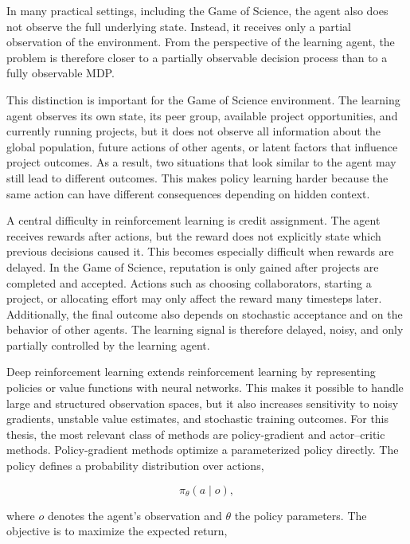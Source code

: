 \documentclass[english,bachelor]{hsluthesis}
\begin{document}
In many practical settings, including the Game of Science, the agent also does not observe the full underlying state. Instead, it receives only a partial observation of the environment. From the perspective of the learning agent, the problem is therefore closer to a partially observable decision process than to a fully observable MDP.

This distinction is important for the Game of Science environment. The learning agent observes its own state, its peer group, available project opportunities, and currently running projects, but it does not observe all information about the global population, future actions of other agents, or latent factors that influence project outcomes. As a result, two situations that look similar to the agent may still lead to different outcomes. This makes policy learning harder because the same action can have different consequences depending on hidden context.

A central difficulty in reinforcement learning is credit assignment. The agent receives rewards after actions, but the reward does not explicitly state which previous decisions caused it. This becomes especially difficult when rewards are delayed. In the Game of Science, reputation is only gained after projects are completed and accepted. Actions such as choosing collaborators, starting a project, or allocating effort may only affect the reward many timesteps later. Additionally, the final outcome also depends on stochastic acceptance and on the behavior of other agents. The learning signal is therefore delayed, noisy, and only partially controlled by the learning agent.

Deep reinforcement learning extends reinforcement learning by representing policies or value functions with neural networks. This makes it possible to handle large and structured observation spaces, but it also increases sensitivity to noisy gradients, unstable value estimates, and stochastic training outcomes. For this thesis, the most relevant class of methods are policy-gradient and actor--critic methods. Policy-gradient methods optimize a parameterized policy directly. The policy defines a probability distribution over actions,

\begin{equation}
\pi_\theta(a \mid o),
\end{equation}

where $o$ denotes the agent's observation and $\theta$ the policy parameters. The objective is to maximize the expected return,
\end{document}
